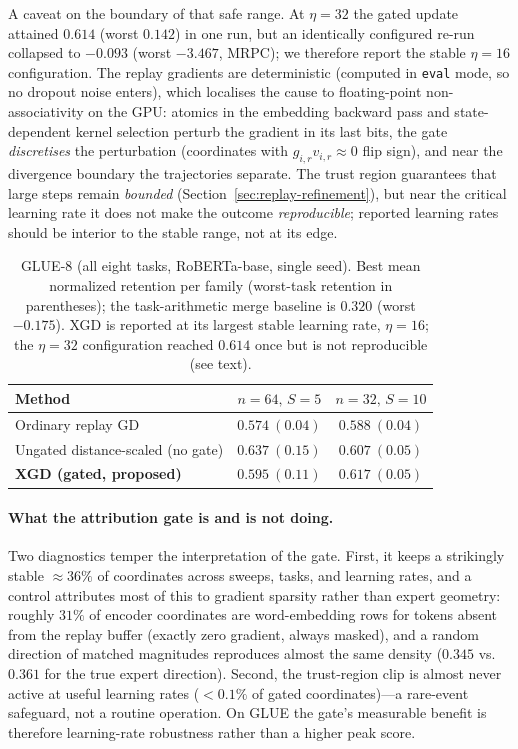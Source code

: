 \documentclass{article} %
\begin{document}
A caveat on the boundary of that safe range. At $\eta=32$ the gated update attained $0.614$ (worst $0.142$) in one run, but an identically configured re-run collapsed to $-0.093$ (worst $-3.467$, MRPC); we therefore report the stable $\eta=16$ configuration. The replay gradients are deterministic (computed in \texttt{eval} mode, so no dropout noise enters), which localises the cause to floating-point non-associativity on the GPU: atomics in the embedding backward pass and state-dependent kernel selection perturb the gradient in its last bits, the gate \emph{discretises} the perturbation (coordinates with $g_{i,r}v_{i,r}\approx 0$ flip sign), and near the divergence boundary the trajectories separate. The trust region guarantees that large steps remain \emph{bounded} (Section~\ref{sec:replay-refinement}), but near the critical learning rate it does not make the outcome \emph{reproducible}; reported learning rates should be interior to the stable range, not at its edge.

\begin{table}[t]
\centering
\caption{GLUE-8 (all eight tasks, RoBERTa-base, single seed). Best mean normalized retention per family (worst-task retention in parentheses); the task-arithmetic merge baseline is $0.320$ (worst $-0.175$). XGD is reported at its largest stable learning rate, $\eta=16$; the $\eta=32$ configuration reached $0.614$ once but is not reproducible (see text).}
\label{tab:glue8}
\begin{tabular}{lcc}
\toprule
Method & $n{=}64,\,S{=}5$ & $n{=}32,\,S{=}10$ \\
\midrule
Ordinary replay GD & $0.574\ (0.04)$ & $0.588\ (0.04)$ \\
Ungated distance-scaled (no gate) & $\mathbf{0.637}\ (0.15)$ & $0.607\ (0.05)$ \\
\textbf{XGD (gated, proposed)} & $0.595\ (0.11)$ & $\mathbf{0.617}\ (0.05)$ \\
\bottomrule
\end{tabular}
\end{table}

\paragraph{What the attribution gate is and is not doing.}
Two diagnostics temper the interpretation of the gate. First, it keeps a strikingly stable $\approx 36\%$ of coordinates across sweeps, tasks, and learning rates, and a control attributes most of this to gradient sparsity rather than expert geometry: roughly $31\%$ of encoder coordinates are word-embedding rows for tokens absent from the replay buffer (exactly zero gradient, always masked), and a random direction of matched magnitudes reproduces almost the same density ($0.345$ vs.\ $0.361$ for the true expert direction). Second, the trust-region clip is almost never active at useful learning rates ($<0.1\%$ of gated coordinates)---a rare-event safeguard, not a routine operation. On GLUE the gate's measurable benefit is therefore learning-rate robustness rather than a higher peak score.
\end{document}
